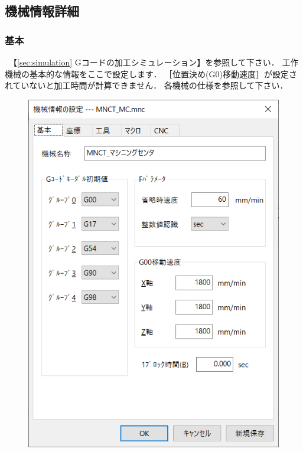 
\subsection{機械情報詳細}

\subsubsection{基本}
\begin{minipage}[t]{0.5\textwidth}
　【\ref{sec:simulation} Gコードの加工シミュレーション】を参照して下さい．
工作機械の基本的な情報をここで設定します．
［位置決め(G0)移動速度］が設定されていないと加工時間が計算できません．
各機械の仕様を参照して下さい．
\end{minipage}
\begin{minipage}[t]{0.5\textwidth}
\vspace*{-2zh}
\begin{figure}[H]
\centering
\includegraphics[scale=0.7]{No6/fig/machine1.png}
\label{fig:machine1.png}
\end{figure}
\end{minipage}

